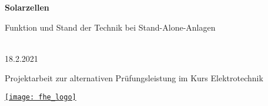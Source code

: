 \begin{titlepage}
    \begin{center}
        \Huge
        \textbf{Solarzellen}

        \vspace{0.5cm}

        \LARGE
        Funktion und Stand der Technik bei Stand-Alone-Anlagen

        \vspace{1.5cm}

        \href{mailto:erik.buennig@fh-erfurt.de}{
        }\\
        18.2.2021

        \vfill

        \Large
        Projektarbeit zur alternativen Prüfungsleistung im Kurs Elektrotechnik

        \vspace{1.5cm}

        \href{https://www.fh-erfurt.de/fhe/}{
            \texttt{[image: fhe\_logo]}
        }
    \end{center}
\end{titlepage}